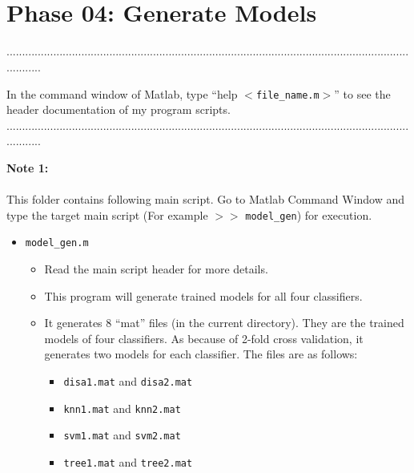 \documentclass[a4paper,12pt]{article} %
\begin{document}
\pagestyle{fancy}
 \renewcommand{\headrulewidth}{1pt}
\sectionfont{\fontsize{12}{15}\selectfont}
\vspace{2cm}


\section*{\\Phase 04: Generate Models}
............................................................................................................................................

In the command window of Matlab, type ``help $<$\verb|file_name.m|$>$'' to see the header documentation of my program scripts.\\
............................................................................................................................................

\textbf{Note 1:}\\\\
This folder contains following main script. Go to Matlab Command Window and type the target main script (For example $>>$  \verb|model_gen|) for execution.
\begin{itemize}
	\item \verb|model_gen.m|   
		\begin{itemize}
		\item Read the main script header for more details.
		\item This program will generate trained models for all four classifiers.
		\item It generates 8 ``mat'' files (in the current directory). They are the trained models of four classifiers. As because of 2-fold cross validation, it generates two models for each classifier. The files are as follows: 
			\begin{itemize}
				\item \verb|disa1.mat| and \verb|disa2.mat|
				\item \verb|knn1.mat| and \verb|knn2.mat|
				\item \verb|svm1.mat| and \verb|svm2.mat|
				\item \verb|tree1.mat| and \verb|tree2.mat|\\\\\\
				
			\end{itemize}	
		\end{itemize}
\end{itemize}
\end{document}
